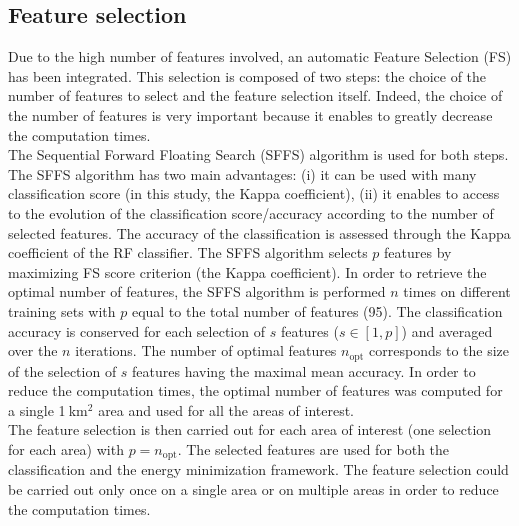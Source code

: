 \subsection{Feature selection}
Due to the high number of features involved, an automatic Feature Selection (FS) has been integrated. This selection is composed of two steps: the choice of the number of features to select and the feature selection itself. Indeed, the choice of the number of features is very important because it enables to greatly decrease the computation times. \\
The Sequential Forward Floating Search (SFFS) \citep{pudil1994floating} algorithm is used for both steps. The SFFS algorithm has two main advantages: (i) it can be used with many classification score (in this study, the Kappa coefficient), (ii) it enables to access to the evolution of the classification score/accuracy according to the number of selected features. The accuracy of the classification is assessed through the Kappa coefficient of the RF classifier. The SFFS algorithm selects $p$ features by maximizing FS score criterion (the Kappa coefficient). In order to retrieve the optimal number of features, the SFFS algorithm is performed $n$ times on different training sets with $p$ equal to the total number of features (95). The classification accuracy is conserved for each selection of $s$ features ($s \in [1, p]$) and averaged over the $n$ iterations. The number of optimal features $n_{\text{opt}}$ corresponds to the size of the selection of $s$ features having the maximal mean accuracy. In order to reduce the computation times, the optimal number of features was computed for a single 1$\:$km$^{2}$ area and used for all the areas of interest. \\
The feature selection is then carried out for each area of interest (one selection for each area) with $p=n_{\text{opt}}$. The selected features are used for both the classification and the energy minimization framework. The feature selection could be carried out only once on a single area or on multiple areas in order to reduce the computation times.

